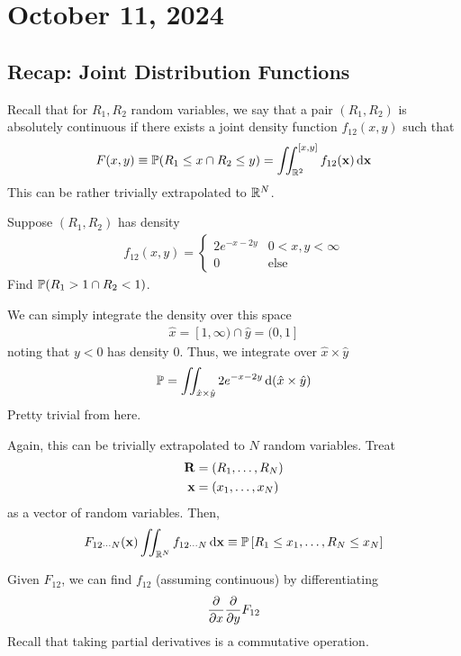 \section{October 11, 2024}

\subsection{Recap: Joint Distribution Functions}
Recall that for $R_1,R_2$ random variables, we say that a pair $(R_1,R_2)$ is absolutely continuous if there exists a joint density function $f_{12}(x,y)$ such that
\begin{align}
    F(x,y) \equiv \mathbb{P}(R_1 \le x \cap R_2 \le y) = \iint_{\mathbb{R}^2}^{[x,y]} f_{12}(\vb{x}) \dd{\vb{x}}
\end{align}
This can be rather trivially extrapolated to $\mathbb{R}^N$.
\begin{example}
    Suppose $(R_1,R_2)$ has density
    \begin{align}
        f_{12}(x,y) = \begin{cases}
            2e^{-x - 2y} & 0 < x,y < \infty\\
            0 & \text{else}
        \end{cases}
    \end{align}
    Find $\mathbb{P}(R_1 > 1 \cap R_2 < 1)$.
\end{example}
\begin{solution}
    We can simply integrate the density over this space
    \begin{align}
    \hat{x} = [1,\infty) \cap \hat{y} = (0,1]    
    \end{align}
    noting that $y < 0$ has density $0$. Thus, we integrate over $\hat{x} \times \hat{y}$
    \begin{align}
        \mathbb{P} = \iint_{\hat{x} \times \hat{y}} 2e^{-x - 2y} \dd{\qty(\hat{x} \times \hat{y})}
    \end{align}
    Pretty trivial from here.
\end{solution}
Again, this can be trivially extrapolated to $N$ random variables. Treat
\begin{align}
    \vb{R} &= (R_1, \ldots, R_N)\\
    \vb{x} &= (x_1, \ldots, x_N)
\end{align}
as a vector of random variables. Then,
\begin{align}
    F_{12\cdots N}(\vb{x}) \iint_{\mathbb{R}^N} f_{12\cdots N} \dd{\vb{x}} \equiv \mathbb{P}\left[ R_1 \le x_1, \ldots, R_N \le x_N \right]
\end{align}
\begin{proposition}
    Given $F_{12}$, we can find $f_{12}$ (assuming continuous) by differentiating
    \begin{align}
        \pdv{x} \pdv{y} F_{12}
    \end{align}
    Recall that taking partial derivatives is a commutative operation.
\end{proposition}

